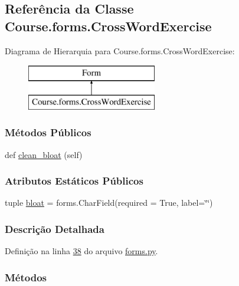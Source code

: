 \hypertarget{classCourse_1_1forms_1_1CrossWordExercise}{}\subsection{Referência da Classe Course.\+forms.\+Cross\+Word\+Exercise}
\label{classCourse_1_1forms_1_1CrossWordExercise}
Diagrama de Hierarquia para Course.\+forms.\+Cross\+Word\+Exercise\+:\begin{figure}[H]
\begin{center}
\leavevmode
\includegraphics[height=2.000000cm]{d1/dc6/classCourse_1_1forms_1_1CrossWordExercise}
\end{center}
\end{figure}
\subsubsection*{Métodos Públicos}
\begin{DoxyCompactItemize}
\item 
def \hyperlink{classCourse_1_1forms_1_1CrossWordExercise_a2e3c06f2bc9b11dd04df1da8825f777b}{clean\+\_\+bloat} (self)
\end{DoxyCompactItemize}
\subsubsection*{Atributos Estáticos Públicos}
\begin{DoxyCompactItemize}
\item 
tuple \hyperlink{classCourse_1_1forms_1_1CrossWordExercise_aa9c9a8c4547386d9e9d9830289e8bd9e}{bloat} = forms.\+Char\+Field(required = True, label=\char`\"{}\char`\"{})
\end{DoxyCompactItemize}


\subsubsection{Descrição Detalhada}


Definição na linha \hyperlink{Course_2forms_8py_source_l00038}{38} do arquivo \hyperlink{Course_2forms_8py_source}{forms.\+py}.



\subsubsection{Métodos}
\hypertarget{classCourse_1_1forms_1_1CrossWordExercise_a2e3c06f2bc9b11dd04df1da8825f777b}{}
